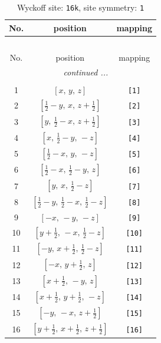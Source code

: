 \documentclass[fleqn,8pt]{jsarticle}
\begin{document}
\begin{longtable}{ccc}
\caption{Wyckoff site: {\tt 16k}, site symmetry: {\tt 1}}
 \\
 \hline \hline
No. & position & mapping \\ \hline \endfirsthead

\multicolumn{2}{l}{\tablename\ \thetable{}} \\
 \hline \hline
No. & position & mapping \\ \hline \endhead

 \hline \hline
\multicolumn{2}{r}{\footnotesize\it continued ...} \\ \endfoot

 \hline \hline
\multicolumn{2}{r}{} \\ \endlastfoot

1 & $\left[ x,\, y,\, z \right]$ & {\tt [1]} \\ \hline
2 & $\left[ \frac{1}{2} - y,\, x,\, z + \frac{1}{2} \right]$ & {\tt [2]} \\ \hline
3 & $\left[ y,\, \frac{1}{2} - x,\, z + \frac{1}{2} \right]$ & {\tt [3]} \\ \hline
4 & $\left[ x,\, \frac{1}{2} - y,\, - z \right]$ & {\tt [4]} \\ \hline
5 & $\left[ \frac{1}{2} - x,\, y,\, - z \right]$ & {\tt [5]} \\ \hline
6 & $\left[ \frac{1}{2} - x,\, \frac{1}{2} - y,\, z \right]$ & {\tt [6]} \\ \hline
7 & $\left[ y,\, x,\, \frac{1}{2} - z \right]$ & {\tt [7]} \\ \hline
8 & $\left[ \frac{1}{2} - y,\, \frac{1}{2} - x,\, \frac{1}{2} - z \right]$ & {\tt [8]} \\ \hline
9 & $\left[ - x,\, - y,\, - z \right]$ & {\tt [9]} \\ \hline
10 & $\left[ y + \frac{1}{2},\, - x,\, \frac{1}{2} - z \right]$ & {\tt [10]} \\ \hline
11 & $\left[ - y,\, x + \frac{1}{2},\, \frac{1}{2} - z \right]$ & {\tt [11]} \\ \hline
12 & $\left[ - x,\, y + \frac{1}{2},\, z \right]$ & {\tt [12]} \\ \hline
13 & $\left[ x + \frac{1}{2},\, - y,\, z \right]$ & {\tt [13]} \\ \hline
14 & $\left[ x + \frac{1}{2},\, y + \frac{1}{2},\, - z \right]$ & {\tt [14]} \\ \hline
15 & $\left[ - y,\, - x,\, z + \frac{1}{2} \right]$ & {\tt [15]} \\ \hline
16 & $\left[ y + \frac{1}{2},\, x + \frac{1}{2},\, z + \frac{1}{2} \right]$ & {\tt [16]} \\
\end{longtable}
\end{document}
